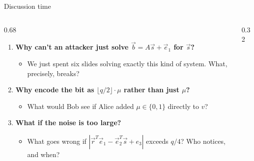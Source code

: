 \ifdefined\PRESENTATION\else\PassOptionsToClass{handout}{beamer}\fi\documentclass[aspectratio=169, lualatex]{beamer}
\begin{document}
\begin{frame}{Discussion time}
	\begin{columns}[c]
		\begin{column}{0.68\textwidth}
			\begin{enumerate}
				\item \textbf{Why can't an attacker just solve $\vec{b} = A\vec{s} + \vec{e}_1$ for $\vec{s}$?}
				      \begin{itemize}
					      \item We just spent six slides solving exactly this kind of system. What, precisely, breaks?
				      \end{itemize}
				\item \textbf{Why encode the bit as $\lfloor q/2 \rfloor \cdot \mu$ rather than just $\mu$?}
				      \begin{itemize}
					      \item What would Bob see if Alice added $\mu \in \{0, 1\}$ directly to $v$?
				      \end{itemize}
				\item \textbf{What if the noise is too large?}
				      \begin{itemize}
					      \item What goes wrong if $|\vec{r}^T\vec{e}_1 - \vec{e}_2^T\vec{s} + e_3|$ exceeds $q/4$? Who notices, and when?
				      \end{itemize}
			\end{enumerate}
		\end{column}
		\begin{column}{0.32\textwidth}
		\end{column}
	\end{columns}
\end{frame}
\end{document}
